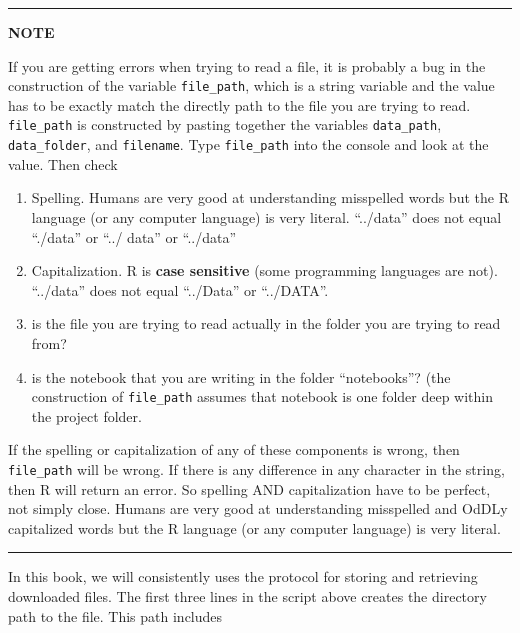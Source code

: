 \documentclass[]{book}
\providecommand{\tightlist}{%
  \setlength{\itemsep}{0pt}\setlength{\parskip}{0pt}}
\theoremstyle{definition}
\theoremstyle{definition}
\theoremstyle{definition}
\theoremstyle{remark}
\begin{document}
\begin{center}\rule{0.5\linewidth}{\linethickness}\end{center}

\textbf{NOTE}

If you are getting errors when trying to read a file, it is probably a
bug in the construction of the variable \texttt{file\_path}, which is a
string variable and the value has to be exactly match the directly path
to the file you are trying to read. \texttt{file\_path} is constructed
by pasting together the variables \texttt{data\_path},
\texttt{data\_folder}, and \texttt{filename}. Type \texttt{file\_path}
into the console and look at the value. Then check

\begin{enumerate}
\def\labelenumi{\arabic{enumi}.}
\tightlist
\item
  Spelling. Humans are very good at understanding misspelled words but
  the R language (or any computer language) is very literal. ``../data''
  does not equal ``./data'' or ``../ data'' or ``../data''
\item
  Capitalization. R is \textbf{case sensitive} (some programming
  languages are not). ``../data'' does not equal ``../Data'' or
  ``../DATA''.
\item
  is the file you are trying to read actually in the folder you are
  trying to read from?
\item
  is the notebook that you are writing in the folder ``notebooks''? (the
  construction of \texttt{file\_path} assumes that notebook is one
  folder deep within the project folder.
\end{enumerate}

If the spelling or capitalization of any of these components is wrong,
then \texttt{file\_path} will be wrong. If there is any difference in
any character in the string, then R will return an error. So spelling
AND capitalization have to be perfect, not simply close. Humans are very
good at understanding misspelled and OdDLy capitalized words but the R
language (or any computer language) is very literal.

\begin{center}\rule{0.5\linewidth}{\linethickness}\end{center}

In this book, we will consistently uses the protocol for storing and
retrieving downloaded files. The first three lines in the script above
creates the directory path to the file. This path includes
\end{document}
